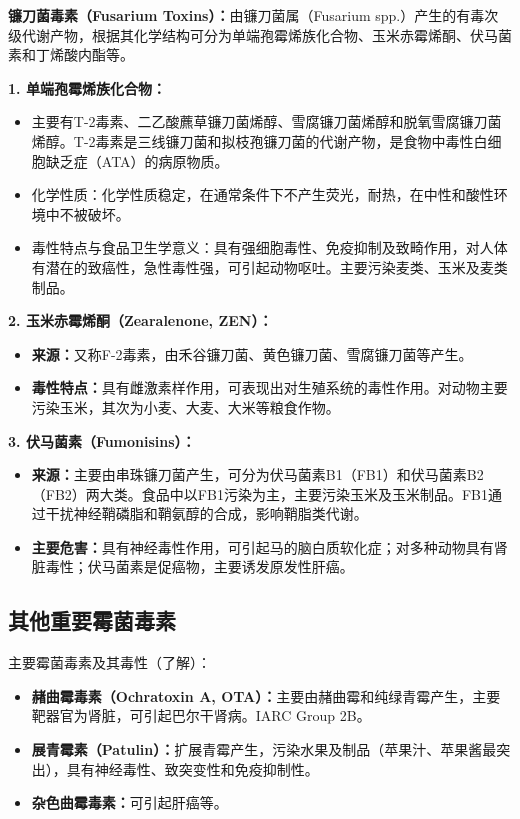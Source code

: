 \begin{defbox}
\textbf{镰刀菌毒素（Fusarium Toxins）：}由镰刀菌属（Fusarium spp.）产生的有毒次级代谢产物，根据其化学结构可分为单端孢霉烯族化合物、玉米赤霉烯酮、伏马菌素和丁烯酸内酯等。

\textbf{1. 单端孢霉烯族化合物：}
\begin{itemize}[leftmargin=*]
    \item 主要有T-2毒素、二乙酸藨草镰刀菌烯醇、雪腐镰刀菌烯醇和脱氧雪腐镰刀菌烯醇。T-2毒素是三线镰刀菌和拟枝孢镰刀菌的代谢产物，是食物中毒性白细胞缺乏症（ATA）的病原物质。
    \item 化学性质：化学性质稳定，在通常条件下不产生荧光，耐热，在中性和酸性环境中不被破坏。
    \item 毒性特点与食品卫生学意义：具有强细胞毒性、免疫抑制及致畸作用，对人体有潜在的致癌性，急性毒性强，可引起动物呕吐。主要污染麦类、玉米及麦类制品。
\end{itemize}

\textbf{2. 玉米赤霉烯酮（Zearalenone, ZEN）：}
\begin{itemize}[leftmargin=*]
    \item \textbf{来源：}又称F-2毒素，由禾谷镰刀菌、黄色镰刀菌、雪腐镰刀菌等产生。
    \item \textbf{毒性特点：}具有雌激素样作用，可表现出对生殖系统的毒性作用。对动物主要污染玉米，其次为小麦、大麦、大米等粮食作物。
\end{itemize}

\textbf{3. 伏马菌素（Fumonisins）：}
\begin{itemize}[leftmargin=*]
    \item \textbf{来源：}主要由串珠镰刀菌产生，可分为伏马菌素B1（FB1）和伏马菌素B2（FB2）两大类。食品中以FB1污染为主，主要污染玉米及玉米制品。FB1通过干扰神经鞘磷脂和鞘氨醇的合成，影响鞘脂类代谢。
    \item \textbf{主要危害：}具有神经毒性作用，可引起马的脑白质软化症；对多种动物具有肾脏毒性；伏马菌素是促癌物，主要诱发原发性肝癌。
\end{itemize}
\end{defbox}

\subsection{其他重要霉菌毒素}

\begin{defbox}
主要霉菌毒素及其毒性（了解）：
\begin{itemize}[leftmargin=*]
    \item \textbf{赭曲霉毒素（Ochratoxin A, OTA）：}主要由赭曲霉和纯绿青霉产生，主要靶器官为肾脏，可引起巴尔干肾病。IARC Group 2B。
    \item \textbf{展青霉素（Patulin）：}扩展青霉产生，污染水果及制品（苹果汁、苹果酱最突出），具有神经毒性、致突变性和免疫抑制性。
    \item \textbf{杂色曲霉毒素：}可引起肝癌等。
\end{itemize}
\end{defbox}

